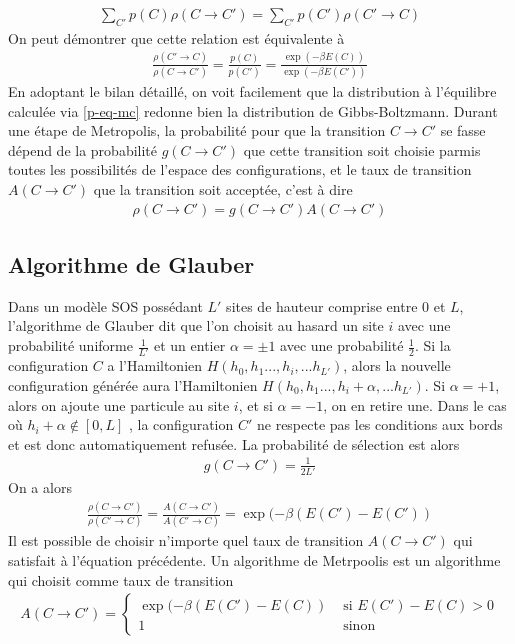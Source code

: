 \begin{align}
    \sum_{C'} p(C) \rho(C \to C') = \sum_{C'} p(C') \rho(C' \to C)
\end{align}
On peut démontrer que cette relation est équivalente à \cite{newman_monte_1999} 
\begin{align}
    \frac{\rho(C'\to C)}{\rho(C \to C')} = \frac{p(C)}{p(C')} = \frac{\exp(-\beta E(C))}{\exp(-\beta E(C'))}
\end{align} 
En adoptant le bilan détaillé, on voit facilement que la distribution à l'équilibre calculée via \ref{p-eq-mc} redonne bien la distribution de Gibbs-Boltzmann.
Durant une étape de Metropolis, la probabilité pour que la transition $C\to C'$ se fasse dépend de la probabilité $g(C\to C')$ que cette transition soit choisie parmis toutes les possibilités de l'espace des configurations, et le taux de transition $A(C \to C')$ que la transition soit acceptée, c'est à dire
\begin{align}
    \rho(C\to C') = g(C\to C') A(C \to C')
\end{align}

    \subsection{Algorithme de Glauber}
Dans un modèle SOS possédant $L'$ sites de hauteur comprise entre $0$ et $L$, l'algorithme de Glauber\cite{glauber_timedependent_1963} dit que l'on choisit au hasard un site $i$ avec une probabilité uniforme $\frac{1}{L'}$ et un entier $\alpha = \pm 1$ avec une probabilité $\frac{1}{2}$. Si la configuration $C$ a l'Hamiltonien $H(h_0,h_1...,h_i,...h_{L'})$, alors la nouvelle configuration générée aura l'Hamiltonien $H(h_0,h_1...,h_i+\alpha,...h_{L'})$.
Si $\alpha=+1$, alors on ajoute une particule au site $i$, et si $\alpha=-1$, on en retire une. Dans le cas où $h_i+\alpha \not\in [0,L]$ , la configuration $C'$ ne respecte pas les conditions aux bords et est donc automatiquement refusée.
La probabilité de sélection est alors 
\begin{align}
    g(C\to C') = \frac{1}{2L'}
\end{align}
On a alors
\begin{align}
    \frac{\rho(C\to C')}{\rho(C' \to C)} = \frac{A(C\to C')}{A(C'\to C)} = \exp(-\beta (E(C')-E(C'))
\end{align}
Il est possible de choisir n'importe quel taux de transition $A(C\to C')$ qui satisfait à l'équation précédente. Un algorithme de Metrpoolis est un algorithme qui choisit comme taux de transition 
\begin{align}
    A(C\to C') = \begin{cases} \exp(-\beta (E(C')-E(C)) &\text{ si } E(C')-E(C) \greater 0 \\
             1 &\text{ sinon} \end{cases}
    \label{taux-transition-metropolis}
\end{align}

